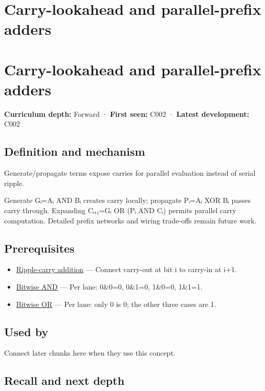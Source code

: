 \hypertarget{appendix-b5c46b2d94ff}{}
\section*{Carry-lookahead and parallel-prefix adders}
\section{Carry-lookahead and parallel-prefix adders}\label{carry-lookahead-and-parallel-prefix-adders}

\textbf{Curriculum depth:} Forward · \textbf{First seen:} C002 · \textbf{Latest development:} C002

\subsection{Definition and mechanism}\label{definition-and-mechanism}

Generate/propagate terms expose carries for parallel evaluation instead of serial ripple.

Generate Gᵢ=Aᵢ AND Bᵢ creates carry locally; propagate Pᵢ=Aᵢ XOR Bᵢ passes carry through. Expanding Cᵢ₊₁=Gᵢ OR (Pᵢ AND Cᵢ) permits parallel carry computation. Detailed prefix networks and wiring trade-offs remain future work.

\subsection{Prerequisites}\label{prerequisites}

\begin{itemize}
\tightlist
\item
  \hyperref[appendix-17917d9fdbe3]{Ripple-carry addition} --- Connect carry-out at bit i to carry-in at i+1.
\item
  \hyperref[appendix-68b52453737c]{Bitwise AND} --- Per lane: 0\&0=0, 0\&1=0, 1\&0=0, 1\&1=1.
\item
  \hyperref[appendix-a427ce8ce8a6]{Bitwise OR} --- Per lane: only 0 is 0; the other three cases are 1.
\end{itemize}

\subsection{Used by}\label{used-by}

Connect later chunks here when they use this concept.

\subsection{Recall and next depth}\label{recall-and-next-depth}

